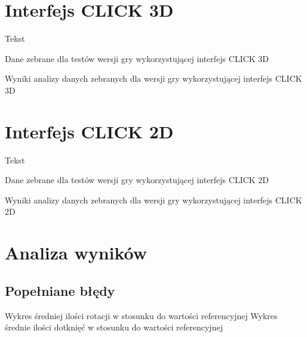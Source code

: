 \documentclass[a4paper,12pt,numbers=noenddot]{report}
\begin{document}
\section{Interfejs CLICK 3D}%
Tekst

\begin{table}
  \caption{Dane zebrane dla testów wersji gry wykorzystującej interfejs CLICK 3D}
  \resizebox{0.9\textwidth}{!}{%
	
  }
  \label{tab:results_CLICK3d}%
  \caption{Wyniki analizy danych zebranych dla wersji gry wykorzystującej interfejs CLICK 3D}
  \resizebox{0.9\textwidth}{!}{%
	
  }
  \label{tab:analysis_CLICK3d}%
\end{table}%

\section{Interfejs CLICK 2D}%
Tekst

\begin{table}
  \caption{Dane zebrane dla testów wersji gry wykorzystującej interfejs CLICK 2D}
  \resizebox{\textwidth}{!}{%
	
  }
  \label{tab:results_CLICK2d}%
  \caption{Wyniki analizy danych zebranych dla wersji gry wykorzystującej interfejs CLICK 2D}
  \resizebox{\textwidth}{!}{%
	
  }
  \label{tab:analysis_CLICK2d}%
\end{table}%

\section{Analiza wyników}

\subsection{Popełniane błędy}

Wykres średniej ilości rotacji w stosunku do wartości referencyjnej
Wykres średnie ilości dotknięć w stosunku do wartości referencyjnej
\end{document}

